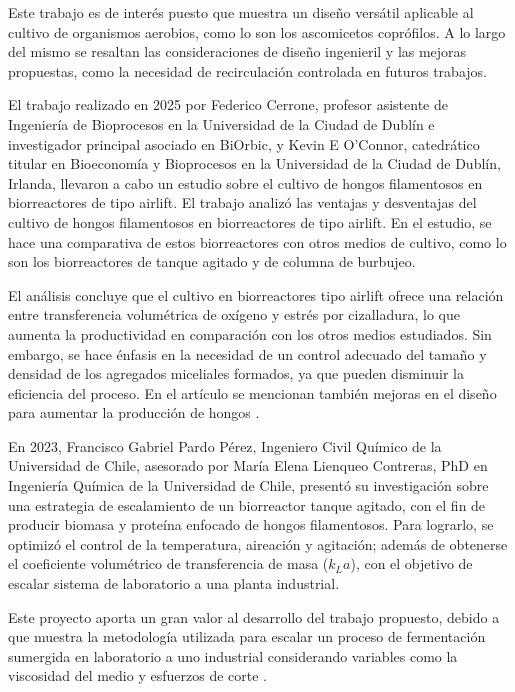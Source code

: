 \documentclass[11pt,tesis,twoside,openright,spanish]{upiiztt}
\begin{document}
Este trabajo es de interés puesto que muestra un diseño versátil aplicable al cultivo
de organismos aerobios, como lo son los ascomicetos coprófilos. A lo largo del
mismo se resaltan las consideraciones de diseño ingenieril y las mejoras
propuestas, como la necesidad de recirculación controlada en futuros trabajos.

El trabajo realizado en 2025 por Federico Cerrone, profesor asistente de Ingeniería
de Bioprocesos en la Universidad de la Ciudad de Dublín e investigador principal
asociado en BiOrbic, y Kevin E O'Connor, catedrático titular en Bioeconomía y
Bioprocesos en la Universidad de la Ciudad de Dublín, Irlanda, llevaron a cabo un
estudio sobre el cultivo de hongos filamentosos en biorreactores de tipo airlift. El
trabajo analizó las ventajas y desventajas del cultivo de hongos filamentosos en
biorreactores de tipo airlift. En el estudio, se hace una comparativa de estos
biorreactores con otros medios de cultivo, como lo son los biorreactores de tanque
agitado y de columna de burbujeo.

El análisis concluye que el cultivo en biorreactores tipo airlift ofrece una relación
entre transferencia volumétrica de oxígeno y estrés por cizalladura, lo que aumenta
la productividad en comparación con los otros medios estudiados. Sin embargo, se
hace énfasis en la necesidad de un control adecuado del tamaño y densidad de los
agregados miceliales formados, ya que pueden disminuir la eficiencia del proceso.
En el artículo se mencionan también mejoras en el diseño para aumentar la
producción de hongos \cite{Cerrone2025}.

En 2023, Francisco Gabriel Pardo Pérez, Ingeniero Civil Químico de la Universidad
de Chile, asesorado por María Elena Lienqueo Contreras, PhD en Ingeniería
Química de la Universidad de Chile, presentó su investigación sobre una estrategia
de escalamiento de un biorreactor tanque agitado, con el fin de producir biomasa y
proteína enfocado de hongos filamentosos. Para lograrlo, se optimizó el control de
la temperatura, aireación y agitación; además de obtenerse el coeficiente
volumétrico de transferencia de masa ($k_L a$), con el objetivo de escalar sistema de
laboratorio a una planta industrial.

Este proyecto aporta un gran valor al desarrollo del trabajo propuesto, debido a que
muestra la metodología utilizada para escalar un proceso de fermentación
sumergida en laboratorio a uno industrial considerando variables como la
viscosidad del medio y esfuerzos de corte \cite{Pardo2023}.
\end{document}

